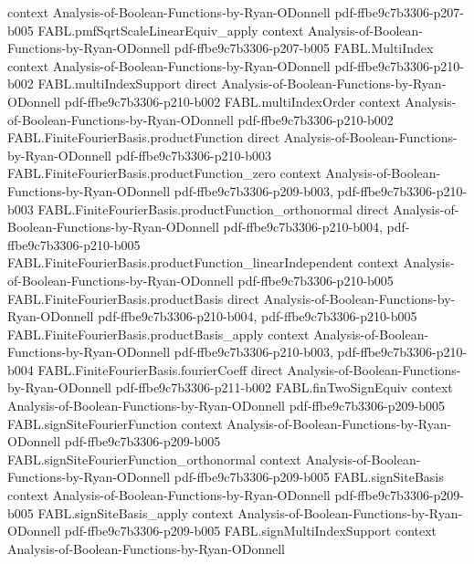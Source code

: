 \begin{theorem}
  {context}
  {Analysis-of-Boolean-Functions-by-Ryan-ODonnell}
  {pdf-ffbe9c7b3306-p207-b005}
\proofstep
  {FABL.pmfSqrtScaleLinearEquiv_apply}
  {context}
  {Analysis-of-Boolean-Functions-by-Ryan-ODonnell}
  {pdf-ffbe9c7b3306-p207-b005}
\proofstep
  {FABL.MultiIndex}
  {context}
  {Analysis-of-Boolean-Functions-by-Ryan-ODonnell}
  {pdf-ffbe9c7b3306-p210-b002}
\proofstep
  {FABL.multiIndexSupport}
  {direct}
  {Analysis-of-Boolean-Functions-by-Ryan-ODonnell}
  {pdf-ffbe9c7b3306-p210-b002}
\proofstep
  {FABL.multiIndexOrder}
  {context}
  {Analysis-of-Boolean-Functions-by-Ryan-ODonnell}
  {pdf-ffbe9c7b3306-p210-b002}
\proofstep
  {FABL.FiniteFourierBasis.productFunction}
  {direct}
  {Analysis-of-Boolean-Functions-by-Ryan-ODonnell}
  {pdf-ffbe9c7b3306-p210-b003}
\proofstep
  {FABL.FiniteFourierBasis.productFunction_zero}
  {context}
  {Analysis-of-Boolean-Functions-by-Ryan-ODonnell}
  {pdf-ffbe9c7b3306-p209-b003,
    pdf-ffbe9c7b3306-p210-b003}
\proofstep
  {FABL.FiniteFourierBasis.productFunction_orthonormal}
  {direct}
  {Analysis-of-Boolean-Functions-by-Ryan-ODonnell}
  {pdf-ffbe9c7b3306-p210-b004,
    pdf-ffbe9c7b3306-p210-b005}
\proofstep
  {FABL.FiniteFourierBasis.productFunction_linearIndependent}
  {context}
  {Analysis-of-Boolean-Functions-by-Ryan-ODonnell}
  {pdf-ffbe9c7b3306-p210-b005}
\proofstep
  {FABL.FiniteFourierBasis.productBasis}
  {direct}
  {Analysis-of-Boolean-Functions-by-Ryan-ODonnell}
  {pdf-ffbe9c7b3306-p210-b004,
    pdf-ffbe9c7b3306-p210-b005}
\proofstep
  {FABL.FiniteFourierBasis.productBasis_apply}
  {context}
  {Analysis-of-Boolean-Functions-by-Ryan-ODonnell}
  {pdf-ffbe9c7b3306-p210-b003,
    pdf-ffbe9c7b3306-p210-b004}
\proofstep
  {FABL.FiniteFourierBasis.fourierCoeff}
  {direct}
  {Analysis-of-Boolean-Functions-by-Ryan-ODonnell}
  {pdf-ffbe9c7b3306-p211-b002}
\proofstep
  {FABL.finTwoSignEquiv}
  {context}
  {Analysis-of-Boolean-Functions-by-Ryan-ODonnell}
  {pdf-ffbe9c7b3306-p209-b005}
\proofstep
  {FABL.signSiteFourierFunction}
  {context}
  {Analysis-of-Boolean-Functions-by-Ryan-ODonnell}
  {pdf-ffbe9c7b3306-p209-b005}
\proofstep
  {FABL.signSiteFourierFunction_orthonormal}
  {context}
  {Analysis-of-Boolean-Functions-by-Ryan-ODonnell}
  {pdf-ffbe9c7b3306-p209-b005}
\proofstep
  {FABL.signSiteBasis}
  {context}
  {Analysis-of-Boolean-Functions-by-Ryan-ODonnell}
  {pdf-ffbe9c7b3306-p209-b005}
\proofstep
  {FABL.signSiteBasis_apply}
  {context}
  {Analysis-of-Boolean-Functions-by-Ryan-ODonnell}
  {pdf-ffbe9c7b3306-p209-b005}
\proofstep
  {FABL.signMultiIndexSupport}
  {context}
  {Analysis-of-Boolean-Functions-by-Ryan-ODonnell}

\end{theorem}
